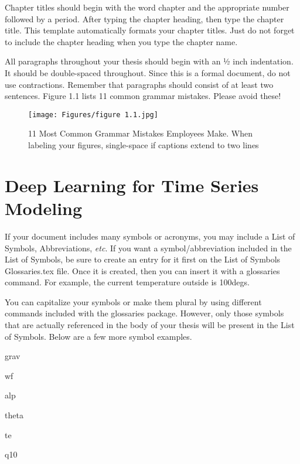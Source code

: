 Chapter titles should begin with the word chapter and the appropriate number followed by a period. After typing the chapter heading, then type the chapter title. This template automatically formats your chapter titles. Just do not forget to include the chapter heading when you type the chapter name.

All paragraphs throughout your thesis should begin with an ½ inch indentation. It should be double-spaced throughout. Since this is a formal document, do not use contractions. Remember that paragraphs should consist of at least two sentences. Figure 1.1 lists 11 common grammar mistakes. Please avoid these!

\begin{figure}[ht]
    \centering
    \texttt{[image: Figures/figure 1.1.jpg]}
    \caption[11 Most Common Grammar Mistakes Employees Make: I'm purposely making this longer to extend to two lines.]{11 Most Common Grammar Mistakes Employees Make. When labeling your figures, single-space if captions extend to two lines}
    \label{fig 1.1}
\end{figure}

\section{Deep Learning for Time Series Modeling}

If your document includes many symbols or acronyms, you may include a List of Symbols, Abbreviations, \textit{etc}. If you want a symbol/abbreviation included in the List of Symbols, be sure to create an entry for it first on the List of Symbols Glossaries.tex file. Once it is created, then you can insert it with a glossaries command. For example, the current temperature outside is 100\glspl{deg}.

You can capitalize your symbols or make them plural by using different commands included with the glossaries package. However, only those symbols that are actually referenced in the body of your thesis will be present in the List of Symbols. Below are a few more symbol examples.

\gls{grav}

\gls{wf}

\gls{alp}

\gls{theta}

\gls{te}

\gls{q10}



